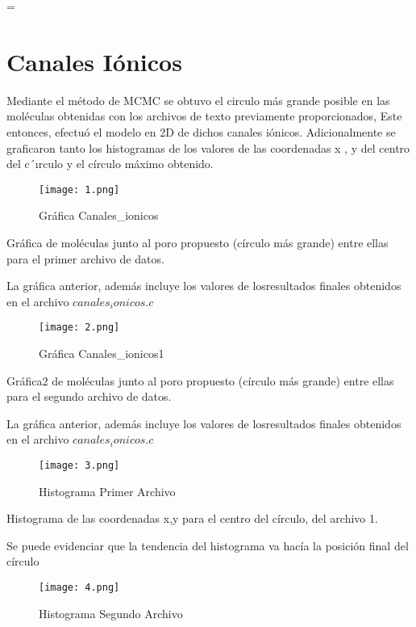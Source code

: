 =\documentclass[12pts,letterpaper]{article}
\begin{document}
\section{Canales Iónicos}

Mediante el método de MCMC se obtuvo el circulo más grande posible en las moléculas obtenidas con los archivos de texto previamente proporcionados, Este entonces, efectuó el modelo en 2D de dichos canales iónicos. Adicionalmente se graficaron tanto los histogramas de los valores de las coordenadas x , y del centro del c´ırculo y el círculo máximo obtenido. 



\begin{figure}[H]
\begin{center}
\label{1}
\texttt{[image: 1.png]}
\caption {Gráfica Canales_ionicos}
\end{center}
\end{figure}

Gráfica de moléculas junto al poro propuesto (círculo más grande) entre ellas para el primer archivo de datos.

La gráfica anterior, además incluye los valores de losresultados finales obtenidos en el archivo $canales_ionicos.c$


\begin{figure}[H]
\begin{center}
\label{2}
\texttt{[image: 2.png]}
\caption {Gráfica Canales_ionicos1}
\end{center}
\end{figure}

Gráfica2 de moléculas junto al poro propuesto (círculo más grande) entre ellas para el segundo archivo de datos.

La gráfica anterior, además incluye los valores de losresultados finales obtenidos en el archivo $canales_ionicos.c$

\begin{figure}[H]
\begin{center}
\label{3}
\texttt{[image: 3.png]}
\caption {Histograma Primer Archivo}
\end{center}
\end{figure}

Histograma de las coordenadas x,y para el centro del círculo, del archivo 1.  

Se puede evidenciar que la tendencia del histograma va hacía la posición final del círculo 


\begin{figure}[H]
\begin{center}
\label{4}
\texttt{[image: 4.png]}
\caption {Histograma Segundo Archivo}
\end{center}
\end{figure}
\end{document}
